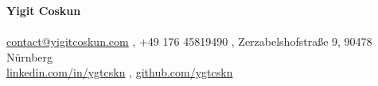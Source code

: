 \begin{center}
    {\rmfamily\bfseries\huge Yigit Coskun} \\[5pt]
    {\normalsize\color{accent}\unskip} \\[4pt]
    {\footnotesize\color{meta}
    \href{mailto:contact@yigitcoskun.com}{contact@yigitcoskun.com} \sep
    +49 176 45819490 \sep
    Zerzabelshofstraße 9, 90478 Nürnberg \\
    \href{https://www.linkedin.com/in/ygtcskn}{linkedin.com/in/ygtcskn} \sep
    \href{https://github.com/ygtcskn}{github.com/ygtcskn}}
\end{center}
